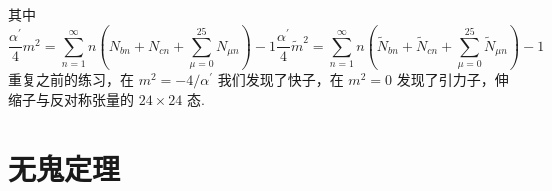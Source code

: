 其中
\begin{subequations}
\begin{equation}
\frac{\alpha^{\prime}}{4} m^{2}=\sum_{n=1}^{\infty} n\left(N_{b n}+N_{c n}+\sum_{\mu=0}^{25} N_{\mu n}\right)-1
\end{equation}
\begin{equation}
\frac{\alpha^{\prime}}{4} \tilde{m}^{2}=\sum_{n=1}^{\infty} n\left(\tilde{N}_{b n}+\tilde{N}_{c n}+\sum_{\mu=0}^{25} \tilde{N}_{\mu n}\right)-1
\end{equation}
\end{subequations}
重复之前的练习，在 $m^{2}=-4 / \alpha^{\prime}$ 我们发现了快子，在 $m^{2}=0$ 发现了引力子，伸缩子与反对称张量的 $24 \times 24$ 态.\\

\section{无鬼定理}%

